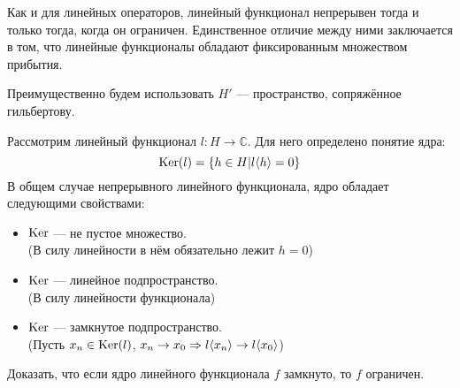 	Как и для линейных операторов, линейный функционал непрерывен тогда и только тогда, когда он ограничен. Единственное отличие
	между ними заключается в том, что линейные функционалы обладают фиксированным множеством прибытия.
	
	Преимущественно будем использовать $H'$ --- пространство, сопряжённое гильбертову.
	
	Рассмотрим линейный функционал $l: H \rightarrow \mathbb{C}$. Для него определено понятие ядра:
	$$\text{Ker}(l) = \{ h \in H | l \langle h \rangle = 0\}$$
	В общем случае непрерывного линейного функционала, ядро обладает следующими свойствами:
	\begin{itemize}
		\item $\text{Ker}$ --- не пустое множество. \\
		(В силу линейности в нём обязательно лежит $h = 0$)
		\item $\text{Ker}$ --- линейное подпространство. \\
		(В силу линейности функционала)
		\item $\text{Ker}$ --- замкнутое подпространство. \\
		(Пусть $x_n \in \text{Ker}(l)$, $x_n \rightarrow x_0 \Rightarrow l\langle x_n \rangle \rightarrow l\langle x_0 \rangle$)
	\end{itemize}
	
	\exc Доказать, что если ядро линейного функционала $f$ замкнуто, то $f$ ограничен.
	
